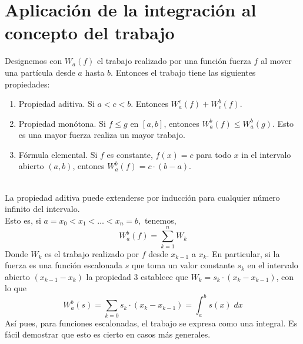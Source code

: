 \section{Aplicación de la integración al concepto del trabajo}

\begin{tcolorbox}
    \begin{prop}
	Designemos con $W_a(f)$ el trabajo realizado por una función fuerza $f$ al mover una partícula desde $a$ hasta $b$. Entonces el trabajo tiene las siguientes propiedades:
	\begin{enumerate}[\bfseries 1.]

	    \item Propiedad aditiva. Si $a<c<b$. Entonces $W_a^c(f) + W_c^b(f)$.

	    \item Propiedad monótona. Si $f\leq g$ en $[a,b]$, entonces $W_a^b (f) \leq W_a^b(g)$. Esto es una mayor fuerza realiza un mayor trabajo.

	    \item Fórmula elemental. Si $f$ es constante, $f(x)=c$ para todo $x$ in el intervalo abierto $(a,b)$, entones $W_a^b(f) = c \cdot (b-a)$.\\\\

	\end{enumerate}

	La propiedad aditiva puede extenderse por inducción para cualquier número infinito del intervalo.\\
	Esto es, si $a=x_0<x_1<\ldots<x_n = b,$ tenemos,
	$$W_a^b(f) = \sum\limits_{k=1}^n W_k$$
	Donde $W_k$  es el trabajo realizado por $f$ desde $x_{k-1}$ a $x_k$. En particular, si la fuerza es una función escalonada $s$ que toma un valor constante $s_k$ en el intervalo abierto $(x_{k-1}-x_k)$ la propiedad 3 establece que $W_k = s_k\cdot (x_k-x_{k-1})$, con lo que 
	$$W_a^b (s) = \sum_{k=0} s_k \cdot (x_k-x_{k-1}) = \int_a^b s(x)\; dx$$
	Así pues, para funciones escalonadas, el trabajo se expresa como una integral. Es fácil demostrar que esto es cierto en casos más generales.
    \end{prop}
\end{tcolorbox}

